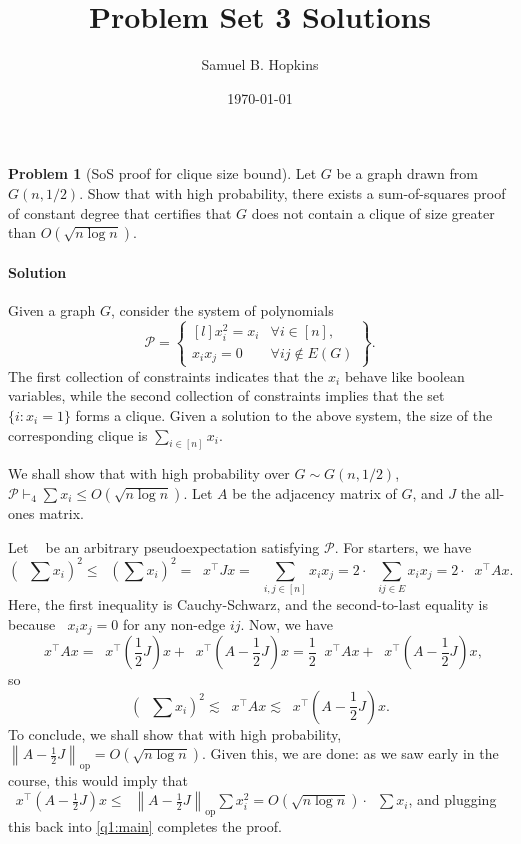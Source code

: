 \documentclass[11pt]{article}
\title{Problem Set 3 Solutions}
\author{Samuel B. Hopkins}
\date{\today}
\theoremstyle{definition}
\newtheorem{problem}[theorem]{Problem}
\DeclareMathOperator{\pE}{\widetilde{\mathbb{E}}} %
\newcommand{\opnorm}[1]{\left\|#1\right\|_{\mathrm{op}}}
\begin{document}
\maketitle

\begin{problem}[SoS proof for clique size bound]
  Let $G$ be a graph drawn from $G(n,1/2)$. Show that with high probability, there exists a sum-of-squares proof of constant degree that certifies that $G$ does not contain a clique of size greater than $O(\sqrt{n \log n})$.
\end{problem}

\paragraph{Solution}

  Given a graph $G$, consider the system of polynomials
  \[ \mathcal{P} = \left\{ \begin{matrix*}[l] x_i^2 = x_i & \forall i \in [n], \\ x_i x_j = 0 & \forall ij \not\in E(G) \end{matrix*} \right\}. \]
  The first collection of constraints indicates that the $x_i$ behave like boolean variables, while the second collection of constraints implies that the set $\{i : x_i = 1\}$ forms a clique. Given a solution to the above system, the size of the corresponding clique is $\sum_{i \in [n]} x_i$.

  We shall show that with high probability over $G \sim G(n,1/2)$, $\mathcal{P} \vdash_4 \sum x_i \le O(\sqrt{n \log n})$. Let $A$ be the adjacency matrix of $G$, and $J$ the all-ones matrix.

  Let $\pE$ be an arbitrary pseudoexpectation satisfying $\mathcal{P}$. For starters, we have
  \[ \left(\pE \sum x_i\right)^2 \le \pE \left( \sum x_i \right)^2 = \pE x^\top J x = \pE \sum_{i,j \in [n]} x_i x_j = 2 \cdot \pE \sum_{ij \in E} x_i x_j = 2 \cdot \pE x^\top A x. \]
  Here, the first inequality is Cauchy-Schwarz, and the second-to-last equality is because $\pE x_i x_j = 0$ for any non-edge $ij$. Now, we have
  \[
    \pE x^\top A x = \pE x^\top \left( \frac{1}{2} J \right) x + \pE x^\top \left( A - \frac{1}{2} J \right) x = \frac{1}{2} \pE x^\top A x + \pE x^\top \left( A - \frac{1}{2} J \right) x,
  \]
  so
  \begin{equation}
    \label{q1:main}
    \left(\pE \sum x_i\right)^2 \lesssim \pE x^\top A x \lesssim \pE x^\top \left( A - \frac{1}{2} J \right) x.
  \end{equation}
  To conclude, we shall show that with high probability, $\opnorm{ A - \frac{1}{2} J } = O(\sqrt{n \log n})$. Given this, we are done: as we saw early in the course, this would imply that $\pE x^\top \left( A - \frac{1}{2} J \right) x \le \pE \opnorm{ A - \frac{1}{2} J } \sum x_i^2 = O(\sqrt{n \log n}) \cdot \pE \sum x_i$, and plugging this back into \eqref{q1:main} completes the proof.
\end{document}
